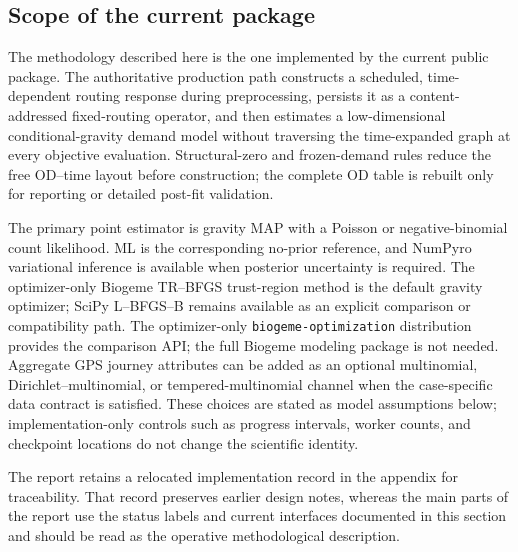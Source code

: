 


\subsection{Scope of the current package}

The methodology described here is the one implemented by the current public
package.  The authoritative production path constructs a scheduled,
time-dependent routing response during preprocessing, persists it as a
content-addressed fixed-routing operator, and then estimates a low-dimensional
conditional-gravity demand model without traversing the time-expanded graph at
every objective evaluation.  Structural-zero and frozen-demand rules reduce
the free OD--time layout before construction; the complete OD table is rebuilt
only for reporting or detailed post-fit validation.

The primary point estimator is gravity MAP with a Poisson or
negative-binomial count likelihood.  ML is the corresponding no-prior
reference, and NumPyro variational inference is available when posterior
uncertainty is required.  The optimizer-only Biogeme TR--BFGS trust-region
method is the default gravity optimizer; SciPy L--BFGS--B remains available as
an explicit comparison or compatibility path.  The
optimizer-only \texttt{biogeme-optimization} distribution provides the
comparison API; the full Biogeme modeling package is not needed.  Aggregate
GPS journey attributes can be added as an optional
multinomial, Dirichlet--multinomial, or tempered-multinomial channel when the
case-specific data contract is satisfied.  These choices are stated as model
assumptions below; implementation-only controls such as progress intervals,
worker counts, and checkpoint locations do not change the scientific identity.

The report retains a relocated implementation record in the appendix for
traceability.  That record preserves earlier design notes, whereas the main
parts of the report use the status labels and current interfaces documented in
this section and should be read as the operative methodological description.

